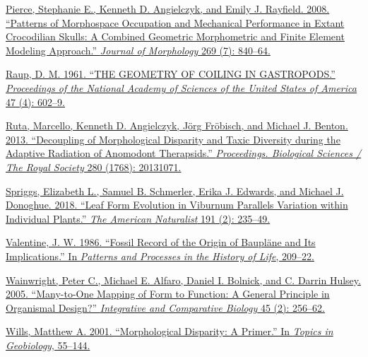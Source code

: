 \href{http://paperpile.com/b/sTGYvp/tSIy}{Pierce, Stephanie E., Kenneth
D. Angielczyk, and Emily J. Rayfield. 2008. ``Patterns of Morphospace
Occupation and Mechanical Performance in Extant Crocodilian Skulls: A
Combined Geometric Morphometric and Finite Element Modeling Approach.''
}\href{http://paperpile.com/b/sTGYvp/tSIy}{\emph{Journal of
Morphology}}\href{http://paperpile.com/b/sTGYvp/tSIy}{ 269 (7):
840--64.}

\href{http://paperpile.com/b/sTGYvp/I0Ic}{Raup, D. M. 1961. ``THE
GEOMETRY OF COILING IN GASTROPODS.''
}\href{http://paperpile.com/b/sTGYvp/I0Ic}{\emph{Proceedings of the
National Academy of Sciences of the United States of
America}}\href{http://paperpile.com/b/sTGYvp/I0Ic}{ 47 (4): 602--9.}

\href{http://paperpile.com/b/sTGYvp/geAO}{Ruta, Marcello, Kenneth D.
Angielczyk, Jörg Fröbisch, and Michael J. Benton. 2013. ``Decoupling of
Morphological Disparity and Taxic Diversity during the Adaptive
Radiation of Anomodont Therapsids.''
}\href{http://paperpile.com/b/sTGYvp/geAO}{\emph{Proceedings. Biological
Sciences / The Royal Society}}\href{http://paperpile.com/b/sTGYvp/geAO}{
280 (1768): 20131071.}

\href{http://paperpile.com/b/sTGYvp/ZEDR}{Spriggs, Elizabeth L., Samuel
B. Schmerler, Erika J. Edwards, and Michael J. Donoghue. 2018. ``Leaf
Form Evolution in Viburnum Parallels Variation within Individual
Plants.'' }\href{http://paperpile.com/b/sTGYvp/ZEDR}{\emph{The American
Naturalist}}\href{http://paperpile.com/b/sTGYvp/ZEDR}{ 191 (2):
235--49.}

\href{http://paperpile.com/b/sTGYvp/6tNm}{Valentine, J. W. 1986.
``Fossil Record of the Origin of Baupläne and Its Implications.'' In
}\href{http://paperpile.com/b/sTGYvp/6tNm}{\emph{Patterns and Processes
in the History of Life}}\href{http://paperpile.com/b/sTGYvp/6tNm}{,
209--22.}

\href{http://paperpile.com/b/sTGYvp/Ejzr}{Wainwright, Peter C., Michael
E. Alfaro, Daniel I. Bolnick, and C. Darrin Hulsey. 2005. ``Many-to-One
Mapping of Form to Function: A General Principle in Organismal Design?''
}\href{http://paperpile.com/b/sTGYvp/Ejzr}{\emph{Integrative and
Comparative Biology}}\href{http://paperpile.com/b/sTGYvp/Ejzr}{ 45 (2):
256--62.}

\href{http://paperpile.com/b/sTGYvp/nFf7}{Wills, Matthew A. 2001.
``Morphological Disparity: A Primer.'' In
}\href{http://paperpile.com/b/sTGYvp/nFf7}{\emph{Topics in
Geobiology}}\href{http://paperpile.com/b/sTGYvp/nFf7}{, 55--144.}

